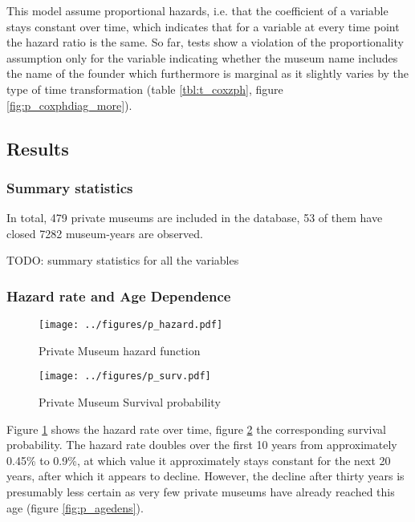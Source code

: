 \documentclass[11pt]{article}
\begin{document}
This model assume proportional hazards, i.e. that the coefficient of a variable stays constant over time, which indicates that for a variable at every time point the hazard ratio is the same.
So far, tests show a violation of the proportionality assumption only for the variable indicating whether the museum name includes the name of the founder  which furthermore is marginal as it slightly varies by the type of time transformation (table \ref{tbl:t_coxzph}, figure \ref{fig:p_coxphdiag_more}).


\subsection*{Results}


\subsubsection*{Summary statistics}


In total, 479 private museums are included in the database, 53 of them have closed
7282 museum-years are observed.

\noindent
TODO: summary statistics for all the variables

\subsubsection*{Hazard rate and Age Dependence}


\begin{figure}[htbp]
\centering
\texttt{[image: ../figures/p\_hazard.pdf]}
\caption{\label{fig:p_hazard}Private Museum hazard function}
\end{figure}

\begin{figure}[htbp]
\centering
\texttt{[image: ../figures/p\_surv.pdf]}
\caption{\label{fig:p_surv}Private Museum Survival probability}
\end{figure}


Figure \ref{fig:p_hazard} shows the hazard rate over time, figure \ref{fig:p_surv} the corresponding survival probability.
The hazard rate doubles over the first 10 years from approximately 0.45\% to 0.9\%, at which value it approximately stays constant for the next 20 years, after which it appears to decline.
However, the decline after thirty years is presumably less certain as very few private museums have already reached this age (figure \ref{fig:p_agedens}).
\end{document}

